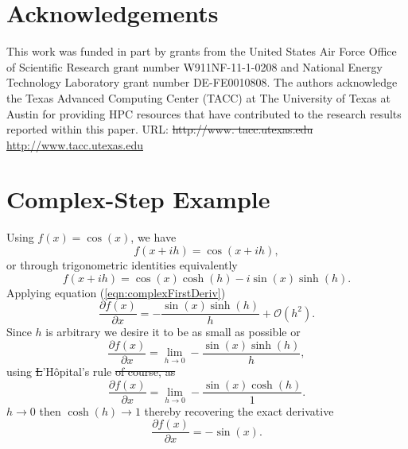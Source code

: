 \documentclass[preprint,12pt]{elsarticle}
\providecommand{\DIFaddtex}[1]{{\protect\color{blue}\uwave{#1}}} %
\providecommand{\DIFdeltex}[1]{{\protect\color{red}\sout{#1}}}                      %
\providecommand{\DIFaddbegin}{} %
\providecommand{\DIFaddend}{} %
\providecommand{\DIFdelbegin}{} %
\providecommand{\DIFdelend}{} %
\providecommand{\DIFadd}[1]{\texorpdfstring{\DIFaddtex{#1}}{#1}} %
\providecommand{\DIFdel}[1]{\texorpdfstring{\DIFdeltex{#1}}{}} %
\begin{document}
\section{Acknowledgements\DIFaddbegin \DIFadd{.}\DIFaddend }
\label{sec:ack}
This work was funded in part by grants from the United States Air Force Office of Scientific Research grant number W911NF-11-1-0208 and National Energy Technology Laboratory grant number DE-FE0010808. The authors acknowledge the Texas Advanced Computing Center (TACC) at The University of Texas at Austin for providing HPC resources that have contributed to the research results reported within this paper. URL: \DIFdelbegin \DIFdel{http://www.
tacc.utexas.edu
}\DIFdelend \DIFaddbegin \url{http://www.tacc.utexas.edu}\DIFadd{.
}\DIFaddend %


\DIFaddbegin \section{\DIFadd{References.}}

\DIFaddend 


\appendix
\renewcommand*{\thesection}{\Alph{section}}
%
\section{Complex-Step Example\DIFaddbegin \DIFadd{.}\DIFaddend }
\label{sec:appendixA}
%
Using $f(x) = \cos(x)$, we have
%
\[
f (x + i h) = \cos(x + i h),
\]
%
or through trigonometric identities equivalently
%
\DIFdelbegin %
\DIFdelend \DIFaddbegin \[
f(x + i h) = \cos(x) \cosh(h) - i \sin(x) \sinh(h).
\]
\DIFaddend %
Applying equation (\ref{eqn:complexFirstDeriv})
\DIFdelbegin %
\DIFdelend \DIFaddbegin \[
    \frac{\partial f(x)}{\partial x} = - \frac{\sin(x) \sinh(h)}{h} + \mathcal{O}(h^2).
\]
\DIFaddend Since $h$ is arbitrary we desire it to be as small as possible or
\[
\frac{\partial f(x)}{\partial x} = \lim_{h \to 0} - \frac{\sin(x) \sinh(h)}{h},
\]
using \DIFdelbegin \DIFdel{L}\DIFdelend \DIFaddbegin \DIFadd{l}\DIFaddend 'H\^opital's rule
\DIFdelbegin %
\DIFdel{of course, as }\DIFdelend \DIFaddbegin \[
\frac{\partial f(x)}{\partial x} = \lim_{h \to 0} - \frac{\sin(x) \cosh(h)}{1}.
\]
\DIFadd{As }\DIFaddend $h \to 0$ then $\cosh(h) \to 1$ thereby recovering the exact derivative
\[
\frac{\partial f(x)}{\partial x} =-\sin(x).
\]
\end{document}
